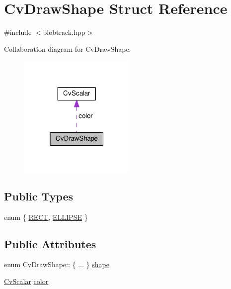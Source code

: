 \hypertarget{structCvDrawShape}{\section{Cv\-Draw\-Shape Struct Reference}
\label{structCvDrawShape}
}


{\ttfamily \#include $<$blobtrack.\-hpp$>$}



Collaboration diagram for Cv\-Draw\-Shape\-:\nopagebreak
\begin{figure}[H]
\begin{center}
\leavevmode
\includegraphics[width=160pt]{structCvDrawShape__coll__graph}
\end{center}
\end{figure}
\subsection*{Public Types}
\begin{DoxyCompactItemize}
\item 
enum \{ \hyperlink{structCvDrawShape_a5f5db6b407a0bc774d2e0612a26961b0ac7336667b154f3c1a84ae7edccd75566}{R\-E\-C\-T}, 
\hyperlink{structCvDrawShape_a5f5db6b407a0bc774d2e0612a26961b0a3fbfe28967315ca06669d4894b92c1e7}{E\-L\-L\-I\-P\-S\-E}
 \}
\end{DoxyCompactItemize}
\subsection*{Public Attributes}
\begin{DoxyCompactItemize}
\item 
enum Cv\-Draw\-Shape\-:: \{ ... \}  \hyperlink{structCvDrawShape_a1b681fbdef628df26c976392b3c1421a}{shape}
\item 
\hyperlink{structCvScalar}{Cv\-Scalar} \hyperlink{structCvDrawShape_a84c962f52506913e9f1b30878bad2cd4}{color}
\end{DoxyCompactItemize}


